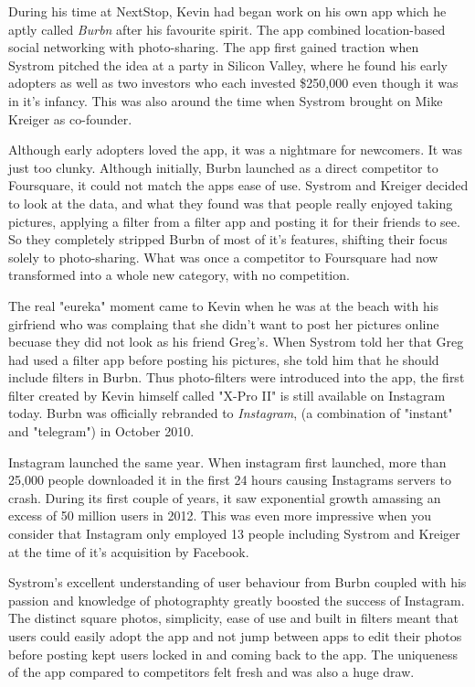 \documentclass[12pt]{article}
\begin{document}
    During his time at NextStop, Kevin had began work on his own app which he 
    aptly called \textit{Burbn} after  his favourite spirit. The app combined location-based social networking with photo-sharing.
    The app first gained traction when Systrom
    pitched the idea at a party in Silicon Valley, where he found his early adopters as well as two investors who each
    invested \$250,000 even though it was in it's infancy. This was also around the time when Systrom brought on Mike Kreiger as co-founder.

    Although early adopters loved the app, it was a nightmare for newcomers. It was just too clunky. Although initially, Burbn launched
    as a direct competitor to Foursquare, it could not match the apps ease of use. Systrom and Kreiger decided to look at the data,
    and what they found was that people really enjoyed taking pictures, applying a filter from a filter app and posting it for their friends to see. So they completely stripped Burbn of 
    most of it's features, shifting their focus solely to photo-sharing. What was once a competitor to Foursquare had now transformed into a whole new category, with no competition.

    The real "eureka" moment came to Kevin when he was at the beach with his girfriend who was complaing that she didn't want to post
    her pictures online becuase they did not look as his friend Greg's. When Systrom told her that Greg had used a filter app before posting
    his pictures, she told him that he should include filters in Burbn. Thus photo-filters were introduced into the app, the first filter
    created by Kevin himself called "X-Pro II" is still available on Instagram today. Burbn was officially rebranded to \textit{Instagram}, (a combination of "instant" and "telegram") in
    October 2010.

    Instagram launched the same year.
    When instagram first launched, more than 25,000 people downloaded it in the first 24 hours causing Instagrams servers to crash.
    During its first couple of years, it saw exponential growth amassing an excess of 50 million users in 2012. This was even more impressive
    when you consider that Instagram only employed 13 people including Systrom and Kreiger at the time of it's acquisition by Facebook.

    Systrom's excellent understanding of user behaviour from Burbn coupled with his passion and knowledge of photographty greatly boosted the success of Instagram.
    The distinct square photos, simplicity, ease of use and built in filters meant that users could easily adopt the app and not jump between apps to edit their photos
    before posting kept users locked in and coming back to the app. The uniqueness of the app compared to competitors felt fresh and was also a huge draw.
\end{document}

